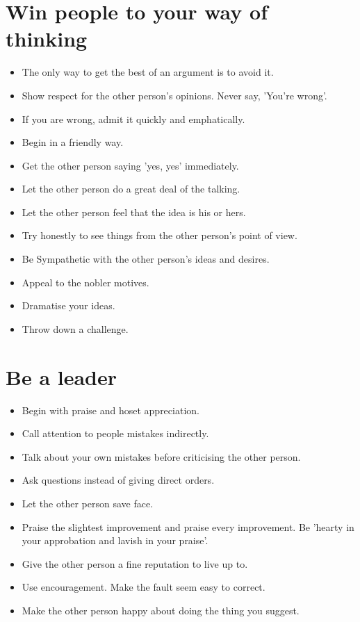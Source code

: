 \documentclass[10pt,portrait]{article}
\begin{document}
    \section*{Win people to your way of thinking}
    \begin{itemize}
      \item The only way to get the best of an argument is to avoid it.
      \item Show respect for the other person's opinions. Never say, 'You're wrong'. 
      \item If you are wrong, admit it quickly and emphatically.
      \item Begin in a friendly way.
      \item Get the other person saying 'yes, yes' immediately.
      \item Let the other person do a great deal of the talking.
      \item Let the other person feel that the idea is his or hers.
      \item Try honestly to see things from the other person's point of view.
      \item Be Sympathetic with the other person's ideas and desires.
      \item Appeal to the nobler motives.
      \item Dramatise your ideas.
      \item Throw down a challenge.
    \end{itemize}
    
    \section*{Be a leader}
    \begin{itemize}
      \item Begin with praise and hoset appreciation.
      \item Call attention to people mistakes indirectly.
      \item Talk about your own mistakes before criticising the other person.
      \item Ask questions instead of giving direct orders.
      \item Let the other person save face.
      \item Praise the slightest improvement and praise every improvement. Be 'hearty in your approbation and lavish in your praise'.
      \item Give the other person a fine reputation to live up to.
      \item Use encouragement. Make the fault seem easy to correct.
      \item Make the other person happy about doing the thing you suggest.
    \end{itemize}
\end{document}
